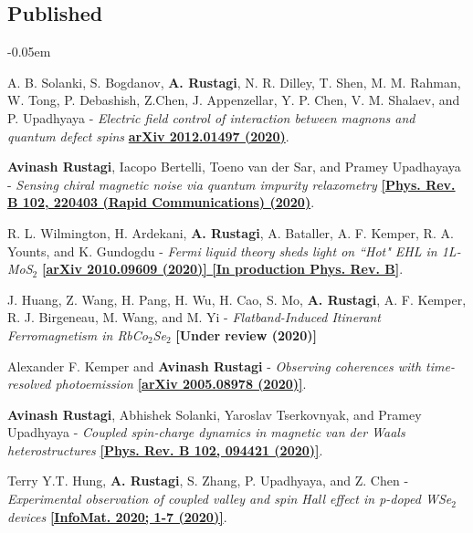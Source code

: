 \documentclass[12pt]{article}
\begin{document}
\subsection*{Published}
\begin{etaremune}
\itemsep-0.05em
\item A. B. Solanki, S. Bogdanov, {\bf A. Rustagi}, N. R. Dilley, T. Shen, M. M. Rahman, W. Tong, P. Debashish, Z.Chen, J. Appenzellar, Y. P. Chen, V. M. Shalaev, and P. Upadhyaya - \textit{Electric field control of interaction between magnons and quantum defect spins} \href{https://arxiv.org/abs/2012.01497}{\bf arXiv 2012.01497 (2020)}.

\item {\bf Avinash Rustagi}, Iacopo Bertelli, Toeno van der Sar, and Pramey Upadhayaya - \textit{Sensing chiral magnetic noise via quantum impurity relaxometry} \href{https://link.aps.org/doi/10.1103/PhysRevB.102.220403}{\bf [Phys. Rev. B 102, 220403 (Rapid Communications) (2020)}.

\item R. L. Wilmington, H. Ardekani, {\bf A. Rustagi}, A. Bataller, A. F. Kemper, R. A. Younts, and K. Gundogdu - \textit{Fermi liquid theory sheds light on ``Hot" EHL in 1L-MoS$_2$} \href{https://arxiv.org/abs/2010.09609}{\bf [arXiv 2010.09609 (2020)] [In production Phys. Rev. B]}.

\item J. Huang, Z. Wang, H. Pang, H. Wu, H. Cao, S. Mo, {\bf A. Rustagi}, A. F. Kemper, R. J. Birgeneau, M. Wang, and M. Yi - \textit{Flatband-Induced Itinerant Ferromagnetism in RbCo$_2$Se$_2$} {\bf [Under review (2020)]}

\item Alexander F. Kemper and {\bf Avinash Rustagi} - \textit{Observing coherences with time-resolved photoemission} \href{https://arxiv.org/abs/2005.08978}{\bf [arXiv 2005.08978 (2020)]}.

\item {\bf Avinash Rustagi}, Abhishek Solanki, Yaroslav Tserkovnyak, and Pramey Upadhyaya - \textit{Coupled spin-charge dynamics in magnetic van der Waals heterostructures} \href{https://link.aps.org/doi/10.1103/PhysRevB.102.094421}{\bf [Phys. Rev. B 102, 094421 (2020)]}.

\item Terry Y.T. Hung, {\bf A. Rustagi}, S. Zhang, P. Upadhyaya, and Z. Chen - \textit{Experimental observation of coupled valley and spin Hall effect in p-doped WSe$_2$ devices} \href{http://dx.doi.org/10.1002/inf2.12095} {\bf[InfoMat. 2020; 1-7 (2020)]}.


\end{etaremune}
\end{document}
